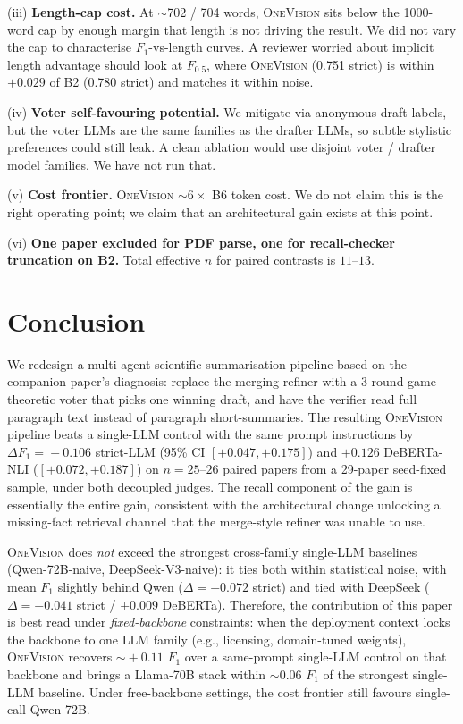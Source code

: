 \documentclass[11pt,a4paper]{article}
\begin{document}
(iii) \textbf{Length-cap cost.}
At $\sim$702 / 704 words, \textsc{OneVision} sits below the
1000-word cap by enough margin that length is not driving the
result. We did not vary the cap to characterise $F_1$-vs-length
curves. A reviewer worried about implicit length advantage should
look at $F_{0.5}$, where \textsc{OneVision} (0.751 strict) is
within $+0.029$ of B2 (0.780 strict) and matches it within noise.

(iv) \textbf{Voter self-favouring potential.}
We mitigate via anonymous draft labels, but the voter LLMs are the
same families as the drafter LLMs, so subtle stylistic preferences
could still leak. A clean ablation would use disjoint voter / drafter
model families. We have not run that.

(v) \textbf{Cost frontier.}
\textsc{OneVision} $\sim 6\times$ B6 token cost. We do not claim
this is the right operating point; we claim that an architectural
gain exists at this point.

(vi) \textbf{One paper excluded for PDF parse, one for recall-checker
truncation on B2.} Total effective $n$ for paired contrasts is $11$--$13$.

\section{Conclusion}
\label{sec:conclusion}

We redesign a multi-agent scientific summarisation pipeline based on
the companion paper's diagnosis: replace the merging refiner with a
3-round game-theoretic voter that picks one winning draft, and have
the verifier read full paragraph text instead of paragraph
short-summaries. The resulting \textsc{OneVision} pipeline beats a
single-LLM control with the same prompt instructions by
$\Delta F_1\!=\!+0.106$ strict-LLM (95\% CI $[+0.047, +0.175]$) and
$+0.126$ DeBERTa-NLI ($[+0.072, +0.187]$) on $n\!=\!25$--$26$
paired papers from a 29-paper seed-fixed sample, under both
decoupled judges. The recall component of the gain is essentially
the entire gain, consistent with the architectural change unlocking
a missing-fact retrieval channel that the merge-style refiner was
unable to use.

\textsc{OneVision} does \emph{not} exceed the strongest
cross-family single-LLM baselines (Qwen-72B-naive, DeepSeek-V3-naive):
it ties both within statistical noise, with mean $F_1$ slightly
behind Qwen ($\Delta = -0.072$ strict) and tied with DeepSeek
($\Delta = -0.041$ strict / $+0.009$ DeBERTa). Therefore, the
contribution of this paper is best read under \emph{fixed-backbone}
constraints: when the deployment context locks the backbone to one
LLM family (e.g., licensing, domain-tuned weights), \textsc{OneVision}
recovers $\sim\!+0.11$ $F_1$ over a same-prompt single-LLM control
on that backbone and brings a Llama-70B stack within $\sim\!0.06$
$F_1$ of the strongest single-LLM baseline. Under free-backbone
settings, the cost frontier still favours single-call Qwen-72B.
\end{document}
